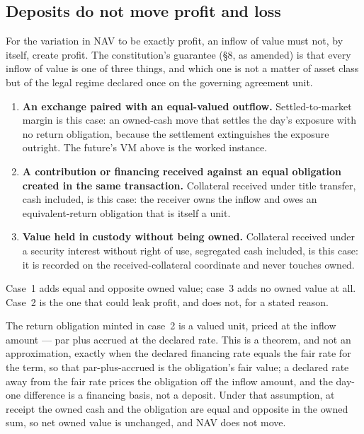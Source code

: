 \subsection{Deposits do not move profit and loss}

For the variation in NAV to be exactly profit, an inflow of value must not, by
itself, create profit. The constitution's guarantee (§8, as amended) is that
every inflow of value is one of three things, and which one is not a matter of
asset class but of the legal regime declared once on the governing agreement
unit.

\begin{enumerate}[label=(\arabic*),leftmargin=*]
\item \textbf{An exchange paired with an equal-valued outflow.}
  Settled-to-market margin is this case: an owned-cash move that settles the
  day's exposure with no return obligation, because the settlement
  extinguishes the exposure outright. The future's VM above is the worked
  instance.
\item \textbf{A contribution or financing received against an equal obligation
  created in the same transaction.} Collateral received under title transfer,
  cash included, is this case: the receiver owns the inflow and owes an
  equivalent-return obligation that is itself a unit.
\item \textbf{Value held in custody without being owned.} Collateral received
  under a security interest without right of use, segregated cash included, is
  this case: it is recorded on the received-collateral coordinate and never
  touches owned.
\end{enumerate}

Case~1 adds equal and opposite owned value; case~3 adds no owned value at all.
Case~2 is the one that could leak profit, and does not, for a stated reason.

\begin{proposition}
The return obligation minted in case~2 is a valued unit, priced at the inflow
amount --- par plus accrued at the declared rate. This is a theorem, and not an
approximation, exactly when the declared financing rate equals the fair rate for
the term, so that par-plus-accrued is the obligation's fair value; a declared rate
away from the fair rate prices the obligation off the inflow amount, and the
day-one difference is a financing basis, not a deposit. Under that assumption, at
receipt the owned cash and the obligation are equal and opposite in the owned sum,
so net owned value is unchanged, and NAV does not move.
\end{proposition}

